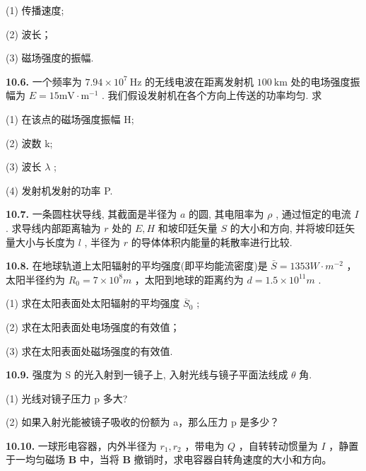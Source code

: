 (1) 传播速度;

(2) 波长；

(3) 磁场强度的振幅.

\vfill

\textbf{10.6.} 一个频率为 $7.94 \times 10^{7} \mathrm{~Hz}$ 的无线电波在距离发射机 $100 \mathrm{~km}$ 处的电场强度振幅为 $E = 15 \mathrm{mV} \cdot \mathrm{m}^{-1}$ . 我们假设发射机在各个方向上传送的功率均匀. 求

(1) 在该点的磁场强度振幅 H;

(2) 波数 k;

(3) 波长 $\lambda$ ;

(4) 发射机发射的功率 P.

\vfill

\newpage

\textbf{10.7.} 一条圆柱状导线, 其截面是半径为 $a$ 的圆, 其电阻率为 $\rho$ , 通过恒定的电流 $I$ . 求导线内部距离轴为 $r$ 处的 $E, H$ 和坡印廷矢量 $S$ 的大小和方向, 并将坡印廷矢量大小与长度为 $l$ , 半径为 $r$ 的导体体积内能量的耗散率进行比较.

\vfill

\textbf{10.8.} 在地球轨道上太阳辐射的平均强度(即平均能流密度)是 $\bar{S}=1353W\cdot m^{-2}$ ，太阳半径约为 $R_{0}=7\times10^{8}m$ ，太阳到地球的距离约为 $d=1.5\times10^{11}m$ .

(1) 求在太阳表面处太阳辐射的平均强度 $\overline{S}_{0}$ ;

(2) 求在太阳表面处电场强度的有效值；

(3) 求在太阳表面处磁场强度的有效值.

\vfill

\newpage

\textbf{10.9.} 强度为 S 的光入射到一镜子上, 入射光线与镜子平面法线成 $\theta$ 角.

(1) 光线对镜子压力 p 多大?

(2) 如果入射光能被镜子吸收的份额为 a，那么压力 p 是多少？

\vfill

\textbf{10.10.} 一球形电容器，内外半径为 $r_1, r_2$ ，带电为 $Q$ ，自转转动惯量为 $I$ ，静置于一均匀磁场 $\pmb{B}$ 中，当将 $\pmb{B}$ 撤销时，求电容器自转角速度的大小和方向。

\vfill

\newpage
